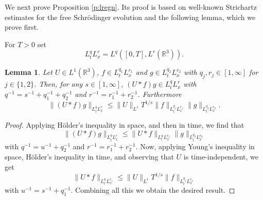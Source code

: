 \documentclass[11pt,a4paper,DIV11]{scrartcl}	%
\newtheorem{lem}[thm]{Lemma}
\newcommand{\R}{\mathds{R}}
\begin{document}
We next prove Proposition \ref{p:lregn}. Its proof is based on well-known
Strichartz estimates for the free Schr\"odinger evolution and the following
lemma, which we prove first.


For $T > 0$ set
\[
  L_t^q L_x^r = L^q([0,T], L^r(\R^3)).
\]


\begin{lem} \label{l:interp}
  Let $U \in L^1(\R^3)$, $f \in L_t^{q_1} L_x^{r_1}$ and $g \in L_t^{q_2}
  L_x^{r_2}$ with $q_j, r_j \in [1,\infty]$ for $j \in \{1,2\}$. Then, for any $s \in [1, \infty]$, $(U * f)
  g \in L_t^q L_x^r$ with $q^{-1} = s^{-1} + q_1^{-1} + q_2^{-1}$ and $r^{-1}
  = r_1^{-1} + r_2^{-1}$. Furthermore
  \[
    \| (U * f)g \|_{L_t^q L_x^r} \le \| U \|_{L^1} T^{1/s} \| f \|_{L_t^{q_1}
    L_x^{r_1}} \| g \|_{L_t^{q_2} L_x^{r_2}}.
  \]
\end{lem}


\begin{proof}
  Applying H\"older's inequality in space, and then in time, we find that
  \[
    \| (U * f) g \|_{L_t^q L_x^r} \le \| U * f \|_{L_t^u L_x^{r_1}} \| g
    \|_{L_t^{q_2} L_x^{r_2}}
  \]
  with $q^{-1} = u^{-1} + q_2^{-1}$ and $r^{-1} = r_1^{-1} + r_2^{-1}$. Now,
  applying Young's inequality in space, H\"older's inequality in time, and
  observing that $U$ is time-independent, we get
  \[
    \| U * f \|_{L_t^u L_x^{r_1}} \le \| U \|_{L^1} T^{1/s} \| f \|_{L_t^{q_1}
    L_x^{r_1}}
  \]
  with $u^{-1} = s^{-1} + q_1^{-1}$. Combining all this we obtain the desired
  result.
\end{proof}
\end{document}
